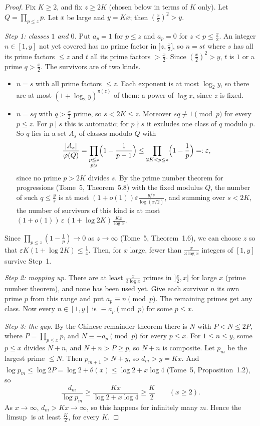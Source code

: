 \begin{proof}
Fix $K\ge2$, and fix $z\ge2K$ (chosen below in terms of $K$ only). Let $Q=\prod_{p\le z}p$. Let $x$ be large and $y=Kx$; then $(\frac x2)^2>y$.

\emph{Step 1: classes $1$ and $0$.} Put $a_p=1$ for $p\le z$ and $a_p=0$ for $z<p\le\frac x2$. An integer $n\in[1,y]$ not yet covered has no prime factor in
$]z,\frac x2]$, so $n=st$ where $s$ has all its prime factors $\le z$ and $t$ all its prime factors $>\frac x2$. Since $(\frac x2)^2>y$, $t$ is $1$ or a prime
$q>\frac x2$. The survivors are of two kinds.
\begin{itemize}
\item $n=s$ with all prime factors $\le z$. Each exponent is at most $\log_2y$, so there are at most $(1+\log_2y)^{\pi(z)}$ of them: a power of $\log x$,
since $z$ is fixed.
\item $n=sq$ with $q>\frac x2$ prime, so $s<2K\le z$. Moreover $sq\not\equiv1\pmod p$ for every $p\le z$. For $p\mid s$ this is automatic; for $p\nmid s$ it
excludes one class of $q$ modulo $p$. So $q$ lies in a set $A_s$ of classes modulo $Q$ with
\[
\frac{|A_s|}{\varphi(Q)}=\prod_{\substack{p\le z\\p\nmid s}}\Bigl(1-\frac1{p-1}\Bigr)\le\prod_{2K<p\le z}\Bigl(1-\frac1p\Bigr)=:\varepsilon,
\]
since no prime $p>2K$ divides $s$. By the prime number theorem for progressions (Tome~5, Theorem~5.8) with the fixed modulus $Q$, the number of such
$q\le\frac ys$ is at most $(1+o(1))\varepsilon\frac{y/s}{\log(x/2)}$, and summing over $s<2K$, the number of survivors of this kind is at most
$(1+o(1))\,\varepsilon\,(1+\log2K)\frac{Kx}{\log x}$.
\end{itemize}
Since $\prod_{p\le z}(1-\frac1p)\to0$ as $z\to\infty$ (Tome~5, Theorem~1.6), we can choose $z$ so that $\varepsilon K(1+\log2K)\le\frac14$. Then, for $x$ large,
fewer than $\frac x{3\log x}$ integers of $[1,y]$ survive Step~1.

\emph{Step 2: mopping up.} There are at least $\frac x{3\log x}$ primes in $]\frac x2,x]$ for large $x$ (prime number theorem), and none has been used yet.
Give each survivor $n$ its own prime $p$ from this range and put $a_p\equiv n\pmod p$. The remaining primes get any class. Now every $n\in[1,y]$ is
$\equiv a_p\pmod p$ for some $p\le x$.

\emph{Step 3: the gap.} By the Chinese remainder theorem there is $N$ with $P<N\le2P$, where $P=\prod_{p\le x}p$, and $N\equiv-a_p\pmod p$ for every
$p\le x$. For $1\le n\le y$, some $p\le x$ divides $N+n$, and $N+n>P\ge p$, so $N+n$ is composite. Let $p_m$ be the largest prime $\le N$. Then
$p_{m+1}>N+y$, so $d_m>y=Kx$. And $\log p_m\le\log2P=\log2+\theta(x)\le\log2+x\log4$ (Tome~5, Proposition~1.2), so
\[
\frac{d_m}{\log p_m}\ge\frac{Kx}{\log2+x\log4}\ge\frac K2\qquad(x\ge2).
\]
As $x\to\infty$, $d_m>Kx\to\infty$, so this happens for infinitely many $m$. Hence the $\limsup$ is at least $\frac K2$, for every $K$.
\end{proof}

